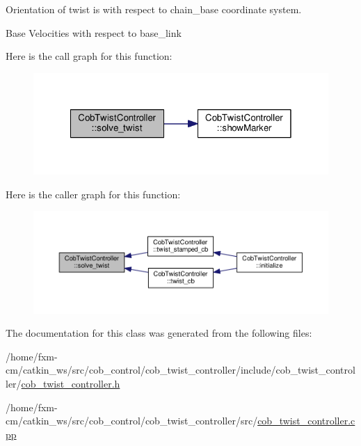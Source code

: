 Orientation of twist is with respect to chain\-\_\-base coordinate system. 

Base Velocities with respect to base\-\_\-link 

Here is the call graph for this function\-:
\nopagebreak
\begin{figure}[H]
\begin{center}
\leavevmode
\includegraphics[width=320pt]{classCobTwistController_afe4ebcf7b22d5fb22c679e174fb61f25_cgraph}
\end{center}
\end{figure}




Here is the caller graph for this function\-:
\nopagebreak
\begin{figure}[H]
\begin{center}
\leavevmode
\includegraphics[width=350pt]{classCobTwistController_afe4ebcf7b22d5fb22c679e174fb61f25_icgraph}
\end{center}
\end{figure}




The documentation for this class was generated from the following files\-:\begin{DoxyCompactItemize}
\item 
/home/fxm-\/cm/catkin\-\_\-ws/src/cob\-\_\-control/cob\-\_\-twist\-\_\-controller/include/cob\-\_\-twist\-\_\-controller/\hyperlink{cob__twist__controller_8h}{cob\-\_\-twist\-\_\-controller.\-h}\item 
/home/fxm-\/cm/catkin\-\_\-ws/src/cob\-\_\-control/cob\-\_\-twist\-\_\-controller/src/\hyperlink{cob__twist__controller_8cpp}{cob\-\_\-twist\-\_\-controller.\-cpp}\end{DoxyCompactItemize}
